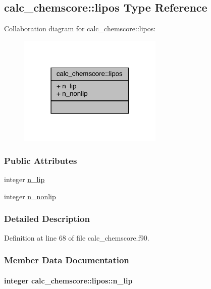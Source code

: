 \hypertarget{structcalc__chemscore_1_1lipos}{\subsection{calc\-\_\-chemscore\-:\-:lipos Type Reference}
\label{structcalc__chemscore_1_1lipos}
}


Collaboration diagram for calc\-\_\-chemscore\-:\-:lipos\-:
\nopagebreak
\begin{figure}[H]
\begin{center}
\leavevmode
\includegraphics[width=195pt]{structcalc__chemscore_1_1lipos__coll__graph}
\end{center}
\end{figure}
\subsubsection*{Public Attributes}
\begin{DoxyCompactItemize}
\item 
integer \hyperlink{structcalc__chemscore_1_1lipos_aefb2a7a91aed4bdccfca9e13322192a8}{n\-\_\-lip}
\item 
integer \hyperlink{structcalc__chemscore_1_1lipos_a341243244ff5b54613d2c4f3a0900129}{n\-\_\-nonlip}
\end{DoxyCompactItemize}


\subsubsection{Detailed Description}


Definition at line 68 of file calc\-\_\-chemscore.\-f90.



\subsubsection{Member Data Documentation}
\hypertarget{structcalc__chemscore_1_1lipos_aefb2a7a91aed4bdccfca9e13322192a8}{
\paragraph[{n\-\_\-lip}]{\setlength{\rightskip}{0pt plus 5cm}integer calc\-\_\-chemscore\-::lipos\-::n\-\_\-lip}}\label{structcalc__chemscore_1_1lipos_aefb2a7a91aed4bdccfca9e13322192a8}


